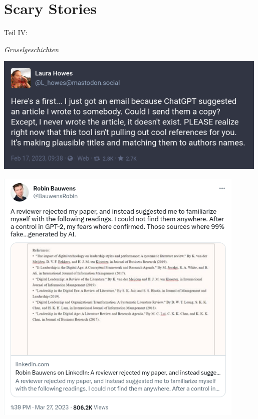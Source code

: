 \documentclass[aspectratio=169,usenames,dvipsnames]{beamer}
\begin{document}

\section{Scary Stories}
\begin{frame}
\begin{center}
\Large
Teil IV:
\bigskip

\huge
\emph{Gruselgeschichten}
\end{center}
\end{frame}

\begin{frame}
\begin{minipage}{0.4\textwidth}
\begin{center}
\includegraphics[width=0.99\textwidth, keepaspectratio]{images/chatgpt_hallucinate_2} 
\end{center}
\end{minipage}\hfill\begin{minipage}{0.48\textwidth}
\begin{center}
\includegraphics[width=0.9\textwidth, keepaspectratio]{images/chatgpt_hallucinate_1} 
\end{center}
\end{minipage}
\end{frame}
\end{document}
